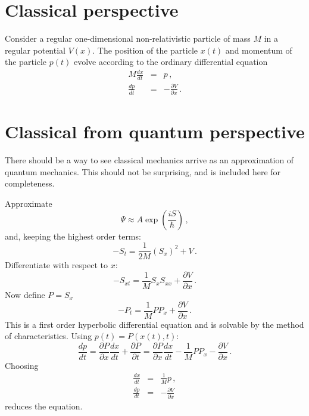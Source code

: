 \documentclass[prb,preprint]{revtex4-1}
\begin{document}
\section{Classical perspective}

Consider a regular one-dimensional non-relativistic particle of mass $M$ in a regular potential $V(x)$.
The position of the particle $x(t)$ and momentum of the particle $p(t)$ evolve according
to the ordinary differential equation
\begin{eqnarray}
M \frac{dx}{dt} & = & p \,, \label{eq:hamilton-x}\\
\frac{dp}{dt} & = & -\frac{\partial V}{\partial x} \,. \label{eq:hamilton-p}
\end{eqnarray}


\section{Classical from quantum perspective}

There should be a way to see classical mechanics arrive as an approximation of quantum
mechanics.  This should not be surprising, and is included here for completeness.\cite{landau1977}

Approximate
\begin{equation}
\Psi \approx A \exp\left(\frac{iS}{\hbar}\right) \,,
\end{equation}
and, keeping the highest order terms:
\begin{equation}
-S_t = \frac{1}{2M}\left(S_x\right)^2 + V \,.
\end{equation}
Differentiate with respect to $x$:
\begin{equation}
-S_{xt} = \frac{1}{M}S_x S_{xx} + \frac{\partial V}{\partial x} \,.
\end{equation}
Now define $P = S_x$
\begin{equation}
-P_t = \frac{1}{M}P P_x + \frac{\partial V}{\partial x} \,.
\end{equation}
This is a first order hyperbolic differential equation and is solvable by the method of
characteristics.  Using $p(t) = P(x(t),t)$:
\begin{equation}
\frac{dp}{dt} = \frac{\partial P}{\partial x}\frac{dx}{dt} + \frac{\partial P}{\partial t}
= \frac{\partial P}{\partial x}\frac{dx}{dt} - \frac{1}{M}P P_x - \frac{\partial V}{\partial x} \,.
\end{equation}
Choosing
\begin{eqnarray}
\frac{dx}{dt} &=& \frac{1}{M}p \,, \\
\frac{dp}{dt} &=& -\frac{\partial V}{\partial x}
\end{eqnarray}
reduces the equation.
\end{document}
